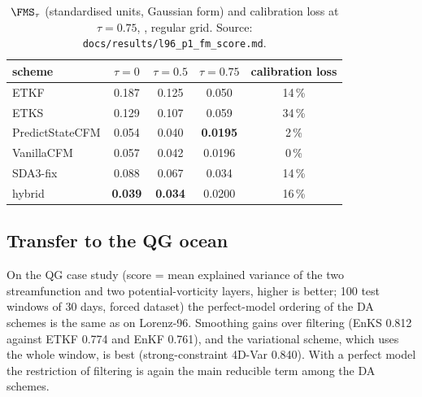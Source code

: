 \begin{table}[t]
\centering\small
\caption{$\FMS_\tau$ (standardised units, Gaussian form) and calibration loss at $\tau = 0.75$, \Sz, regular grid. Source: \texttt{docs/results/l96\_p1\_fm\_score.md}.}
\label{tab:fms-s0}
\begin{tabular}{lcccc}
\toprule
scheme & $\tau = 0$ & $\tau = 0.5$ & $\tau = 0.75$ & calibration loss \\
\midrule
ETKF & 0.187 & 0.125 & 0.050 & 14\,\% \\
ETKS & 0.129 & 0.107 & 0.059 & 34\,\% \\
PredictStateCFM & 0.054 & 0.040 & \textbf{0.0195} & 2\,\% \\
VanillaCFM & 0.057 & 0.042 & 0.0196 & 0\,\% \\
SDA3-fix & 0.088 & 0.067 & 0.034 & 14\,\% \\
hybrid & \textbf{0.039} & \textbf{0.034} & 0.0200 & 16\,\% \\
\bottomrule
\end{tabular}
\end{table}


\subsection{Transfer to the QG ocean}\label{sec:q1-qg}
On the QG case study (score = mean explained variance of the two
streamfunction and two potential-vorticity layers, higher is better; 100 test
windows of 30 days, forced dataset) the perfect-model ordering of the DA schemes
is the same as on Lorenz-96. Smoothing gains over filtering (EnKS 0.812 against
ETKF 0.774 and EnKF 0.761), and the variational scheme, which uses the whole
window, is best (strong-constraint 4D-Var 0.840). With a perfect model the
restriction of filtering is again the main reducible term among the DA schemes.

